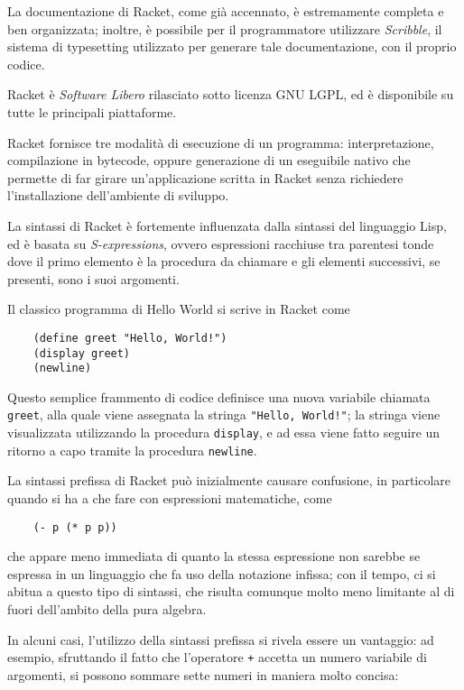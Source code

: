 La documentazione di Racket, come gi\`a accennato, \`e estremamente
completa e ben organizzata; inoltre, \`e possibile per il programmatore
utilizzare \emph{Scribble}, il sistema di typesetting utilizzato per
generare tale documentazione, con il proprio codice.

Racket \`e \emph{Software Libero} rilasciato sotto licenza GNU LGPL, ed
\`e disponibile su tutte le principali piattaforme.

Racket fornisce tre modalit\`a di esecuzione di un programma:
interpretazione, compilazione in bytecode, oppure generazione di un
eseguibile nativo che permette di far girare un'applicazione scritta in
Racket senza richiedere l'installazione dell'ambiente di sviluppo.

La sintassi di Racket \`e fortemente influenzata dalla sintassi del
linguaggio Lisp, ed \`e basata su \emph{S-expressions}, ovvero espressioni
racchiuse tra parentesi tonde dove il primo elemento \`e la procedura
da chiamare e gli elementi successivi, se presenti, sono i suoi
argomenti.

Il classico programma di Hello World si scrive in Racket come

\begin{lstlisting}
    (define greet "Hello, World!")
    (display greet)
    (newline)
\end{lstlisting}

Questo semplice frammento di codice definisce una nuova variabile
chiamata \lstinline{greet}, alla quale viene assegnata la stringa
\lstinline{"Hello, World!"}; la stringa viene visualizzata utilizzando
la procedura \lstinline{display}, e ad essa viene fatto seguire un
ritorno a capo tramite la procedura \lstinline{newline}.

La sintassi prefissa di Racket pu\`o inizialmente causare confusione,
in particolare quando si ha a che fare con espressioni matematiche,
come

\begin{lstlisting}
    (- p (* p p))
\end{lstlisting}

che appare meno immediata di quanto la stessa espressione non sarebbe
se espressa in un linguaggio che fa uso della notazione infissa; con il
tempo, ci si abitua a questo tipo di sintassi, che risulta comunque molto
meno limitante al di fuori dell'ambito della pura algebra.

In alcuni casi, l'utilizzo della sintassi prefissa si rivela essere un
vantaggio: ad esempio, sfruttando il fatto che l'operatore \lstinline{+}
accetta un numero variabile di argomenti, si possono sommare sette numeri
in maniera molto concisa:


